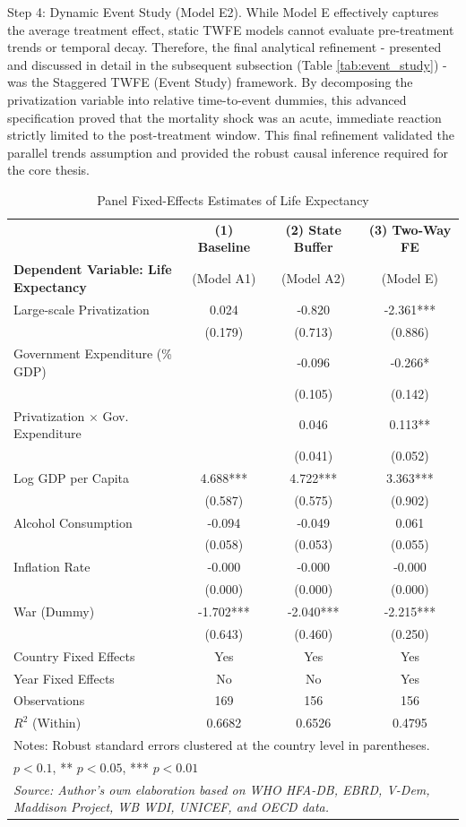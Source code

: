 \documentclass[en,magisterska]{pracamgr}
\begin{document}
Step 4: Dynamic Event Study (Model E2). While Model E effectively captures the average treatment effect, static TWFE models cannot evaluate pre-treatment trends or temporal decay. 
Therefore, the final analytical refinement  -  presented and discussed in detail in the subsequent subsection (Table \ref{tab:event_study})  -  was the Staggered TWFE (Event Study) 
framework. By decomposing the privatization variable into relative time-to-event dummies, this advanced specification proved that the mortality shock was an acute, immediate reaction 
strictly limited to the post-treatment window. This final refinement validated the parallel trends assumption and provided the robust causal inference required for the core thesis.


\begin{table}[H]
\centering
\caption{Panel Fixed-Effects Estimates of Life Expectancy}
\label{tab:life_expectancy_models}
\footnotesize
\begin{tabular}{l c c c}
\toprule
 & \textbf{(1) Baseline} & \textbf{(2) State Buffer} & \textbf{(3) Two-Way FE} \\
\textbf{Dependent Variable: Life Expectancy} & (Model A1) & (Model A2) & (Model E) \\
\midrule
Large-scale Privatization & 0.024 & -0.820 & -2.361*** \\
 & (0.179) & (0.713) & (0.886) \\
Government Expenditure (\% GDP) & & -0.096 & -0.266* \\
 & & (0.105) & (0.142) \\
Privatization $\times$ Gov. Expenditure & & 0.046 & 0.113** \\
 & & (0.041) & (0.052) \\
Log GDP per Capita & 4.688*** & 4.722*** & 3.363*** \\
 & (0.587) & (0.575) & (0.902) \\
Alcohol Consumption & -0.094 & -0.049 & 0.061 \\
 & (0.058) & (0.053) & (0.055) \\
Inflation Rate & -0.000 & -0.000 & -0.000 \\
 & (0.000) & (0.000) & (0.000) \\
War (Dummy) & -1.702*** & -2.040*** & -2.215*** \\
 & (0.643) & (0.460) & (0.250) \\
\midrule
Country Fixed Effects & Yes & Yes & Yes \\
Year Fixed Effects & No & No & Yes \\
Observations & 169 & 156 & 156 \\
$R^2$ (Within) & 0.6682 & 0.6526 & 0.4795 \\
\bottomrule
\multicolumn{4}{l}{\scriptsize Notes: Robust standard errors clustered at the country level in parentheses.} \\
\multicolumn{4}{l}{\scriptsize * $p < 0.1$, ** $p < 0.05$, *** $p < 0.01$} \\
\multicolumn{4}{l}{\scriptsize \textit{Source: Author's own elaboration based on WHO HFA-DB, EBRD, V-Dem, Maddison Project, WB WDI, UNICEF, and OECD data.}} \\
\end{tabular}
\end{table}
\end{document}
